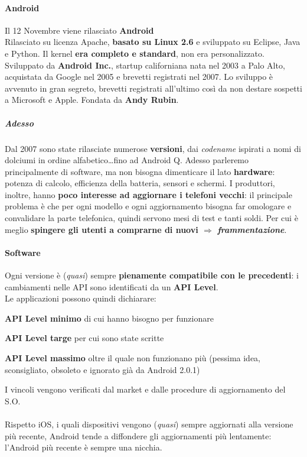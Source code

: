 \documentclass[10pt]{book}
\begin{document}
\paragraph{Android} Il 12 Novembre viene rilasciato \textbf{Android}\\
Rilasciato su licenza Apache, \textbf{basato su Linux 2.6} e sviluppato su Eclipse, Java e Python. Il kernel \textbf{era completo e standard}, non era personalizzato.\\
Sviluppato da \textbf{Android Inc.}, startup californiana nata nel 2003 a Palo Alto, acquistata da Google nel 2005 e brevetti registrati nel 2007. Lo sviluppo è avvenuto in gran segreto, brevetti registrati all'ultimo così da non destare sospetti a Microsoft e Apple. Fondata da \textbf{Andy Rubin}.
\subparagraph{Adesso} Dal 2007 sono state rilasciate numerose \textbf{versioni}, dai \textit{codename} ispirati a nomi di dolciumi in ordine alfabetico\ldots fino ad Android Q. Adesso parleremo principalmente di software, ma non bisogna dimenticare il lato \textbf{hardware}: potenza di calcolo, efficienza della batteria, sensori e schermi. I produttori, inoltre, hanno \textbf{poco interesse ad aggiornare i telefoni vecchi}: il principale problema è che per ogni modello e ogni aggiornamento bisogna far omologare e convalidare la parte telefonica, quindi servono mesi di test e tanti soldi. Per cui è meglio \textbf{spingere gli utenti a comprarne di nuovi $\Rightarrow$ \textit{frammentazione}}.
\paragraph{Software} Ogni versione è (\textit{quasi}) sempre \textbf{pienamente compatibile con le precedenti}: i cambiamenti nelle API sono identificati da un \textbf{API Level}.\\
Le applicazioni possono quindi dichiarare:
\begin{list}{}{}
	\item \textbf{API Level minimo} di cui hanno bisogno per funzionare
	\item \textbf{API Level targe} per cui sono state scritte
	\item \textbf{API Level massimo} oltre il quale non funzionano più (pessima idea, sconsigliato, obsoleto e ignorato già da Android 2.0.1)
\end{list}
I vincoli vengono verificati dal market e dalle procedure di aggiornamento del S.O.\\\\
Rispetto iOS, i quali dispositivi vengono (\textit{quasi}) sempre aggiornati alla versione più recente, Android tende a diffondere gli aggiornamenti più lentamente: l'Android più recente è sempre una nicchia.\\
\end{document}
